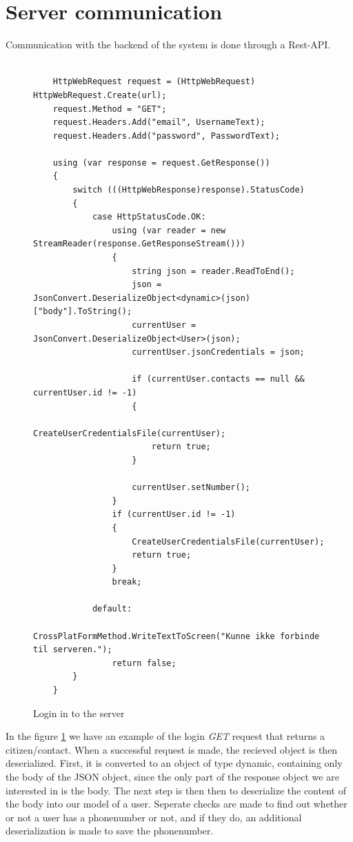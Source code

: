 \section{Server communication}
Communication with the backend of the system is done through a Rest-API. 
\begin{figure}[h]
    \centering
    \begin{lstlisting}

    HttpWebRequest request = (HttpWebRequest) HttpWebRequest.Create(url);
    request.Method = "GET";
    request.Headers.Add("email", UsernameText);
    request.Headers.Add("password", PasswordText);

    using (var response = request.GetResponse())
    {
        switch (((HttpWebResponse)response).StatusCode)
        {
            case HttpStatusCode.OK:
                using (var reader = new StreamReader(response.GetResponseStream()))
                {
                    string json = reader.ReadToEnd();
                    json = JsonConvert.DeserializeObject<dynamic>(json) ["body"].ToString();
                    currentUser = JsonConvert.DeserializeObject<User>(json);
                    currentUser.jsonCredentials = json;

                    if (currentUser.contacts == null && currentUser.id != -1)
                    {
                        CreateUserCredentialsFile(currentUser);
                        return true;
                    }

                    currentUser.setNumber();
                }
                if (currentUser.id != -1)
                {
                    CreateUserCredentialsFile(currentUser);
                    return true;
                }
                break;

            default:
                CrossPlatFormMethod.WriteTextToScreen("Kunne ikke forbinde til serveren.");
                return false;
        }
    }
\end{lstlisting}
    \caption{Login in to the server}
    \label{fig:appLogIn}
\end{figure}
In the figure \ref{fig:appLogIn} we have an example of the login \textit{GET} request that returns a citizen/contact. When a successful request is made, the recieved object is then deserialized. First, it is converted to an object of type dynamic, containing only the body of the JSON object, since the only part of the response object we are interested in is the body. The next step is then then to deserialize the content of the body into our model of a user. Seperate checks are made to find out whether or not a user has a phonenumber or not, and if they do, an additional deserialization is made to save the phonenumber.

